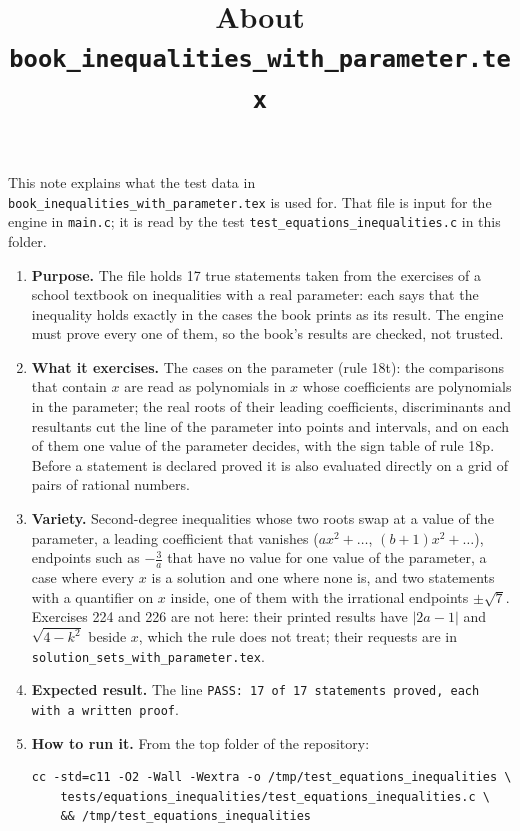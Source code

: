\documentclass[11pt,a4paper]{article}
\title{About \texttt{book\_inequalities\_with\_parameter.tex}}
\author{}
\date{}
\begin{document}
\maketitle
This note explains what the test data in \texttt{book\_inequalities\_with\_parameter.tex} is used for. That file is input for the engine in \texttt{main.c}; it is read by the test \texttt{test\_equations\_inequalities.c} in this folder.

\begin{enumerate}
\item \textbf{Purpose.} The file holds 17 true statements taken from the exercises of a school textbook on inequalities with a real parameter: each says that the inequality holds exactly in the cases the book prints as its result. The engine must prove every one of them, so the book's results are checked, not trusted.

\item \textbf{What it exercises.} The cases on the parameter (rule 18t): the comparisons that contain $x$ are read as polynomials in $x$ whose coefficients are polynomials in the parameter; the real roots of their leading coefficients, discriminants and resultants cut the line of the parameter into points and intervals, and on each of them one value of the parameter decides, with the sign table of rule 18p. Before a statement is declared proved it is also evaluated directly on a grid of pairs of rational numbers.

\item \textbf{Variety.} Second-degree inequalities whose two roots swap at a value of the parameter, a leading coefficient that vanishes ($ax^{2} + \ldots$, $(b + 1)x^{2} + \ldots$), endpoints such as $-\frac{3}{a}$ that have no value for one value of the parameter, a case where every $x$ is a solution and one where none is, and two statements with a quantifier on $x$ inside, one of them with the irrational endpoints $\pm\sqrt{7}$. Exercises 224 and 226 are not here: their printed results have $\left|2a - 1\right|$ and $\sqrt{4 - k^{2}}$ beside $x$, which the rule does not treat; their requests are in \texttt{solution\_sets\_with\_parameter.tex}.

\item \textbf{Expected result.} The line \texttt{PASS: 17 of 17 statements proved, each with a written proof}.

\item \textbf{How to run it.} From the top folder of the repository:
\begin{verbatim}
cc -std=c11 -O2 -Wall -Wextra -o /tmp/test_equations_inequalities \
    tests/equations_inequalities/test_equations_inequalities.c \
    && /tmp/test_equations_inequalities
\end{verbatim}
\end{enumerate}
\end{document}
